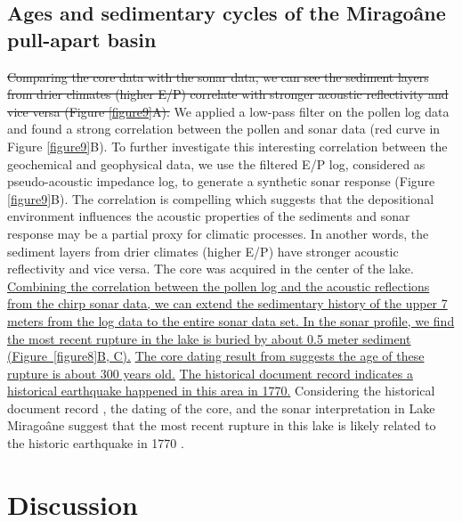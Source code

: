 \documentclass[linenumbers,draft]{agujournal}
\begin{document}
\subsection{Ages and sedimentary cycles of the Mirago\^ane pull-apart basin}
\st{Comparing the core data with the sonar data, we can see the sediment layers from drier climates (higher E/P) correlate with stronger acoustic reflectivity and vice versa (Figure {\ref{figure9}}A).} We applied a low-pass filter on the pollen log data and found a strong correlation between the pollen and sonar data (red curve in Figure \ref{figure9}B). To further investigate this interesting correlation between the geochemical and geophysical data, we use the filtered E/P log, considered as pseudo-acoustic impedance log, to generate a synthetic sonar response (Figure \ref{figure9}B). The correlation is compelling which suggests that the depositional environment influences the acoustic properties of the sediments and sonar response may be a partial proxy for climatic processes. In another words, the sediment layers from drier climates (higher E/P) have stronger acoustic reflectivity and vice versa. The core was acquired in the center of the lake. \ul{Combining the correlation between the pollen log and the acoustic reflections from the chirp sonar data, we can extend the sedimentary history of the upper 7 meters from the log data to the entire sonar data set. In the sonar profile, we find the most recent rupture in the lake is buried by about 0.5 meter sediment (Figure~{\ref{figure8}}B, C).} \ul{The core dating result from}\underline{ \citet{higuera199910}}\ul{ suggests the age of these rupture is about 300 years old.} \underline{The historical document record \citep{bakun2012significant}}\ul{ indicates a historical earthquake happened in this area in 1770.} Considering the historical document record \citep{bakun2012significant}, the dating of the core, and the sonar interpretation in Lake Mirago\^ane suggest that the most recent rupture in this lake is likely related to the historic earthquake in 1770 \citep{bakun2012significant}.

\section{Discussion}
\end{document}
